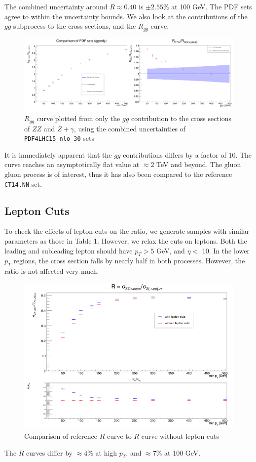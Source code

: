 \documentclass[11pt,a4paper,final]{report}
\begin{document}
The combined uncertainty around $R \approx 0.40$ is $\pm 2.55\%$ at 100 GeV. The PDF sets agree to within the uncertainty bounds. We also look at the contributions of the $gg$ subprocess to the cross sections, and the $R_{gg}$ curve.
\begin{figure}[H]
\centering
	\includegraphics[width=0.7\linewidth]{gg_PDF4.png}
	\caption{$R_{gg}$ curve plotted from only the $gg$ contribution to the cross sections of $ZZ$ and $Z+\gamma$, using the combined uncertainties of \texttt{PDF4LHC15\_nlo\_30} sets}
\end{figure}
It is immediately apparent that the $gg$ contributions differs by a factor of 10. The curve reaches an asymptotically flat value at $\approx 2$ TeV and beyond. The gluon gluon process is of interest, thus it has also been compared to the reference \texttt{CT14.NN} set.

\subsection{Lepton Cuts}
To check the effects of lepton cuts on the ratio, we generate samples with similar parameters as those in Table 1. However, we relax the cuts on leptons. Both the leading and subleading lepton should have $p_T > 5$ GeV, and $\eta <$ 10. In the lower $p_T$ regions, the cross section falls by nearly half in both processes. However, the ratio is not affected very much.
\begin{figure}[H]
\centering
	\includegraphics[width = 0.7\linewidth]{lep_cuts.png}
	\caption{Comparison of reference $R$ curve to $R$ curve without lepton cuts}
\end{figure}
The $R$ curves differ by $\approx 4\%$ at high $p_T$, and $\approx 7\%$ at 100 GeV.
\end{document}
